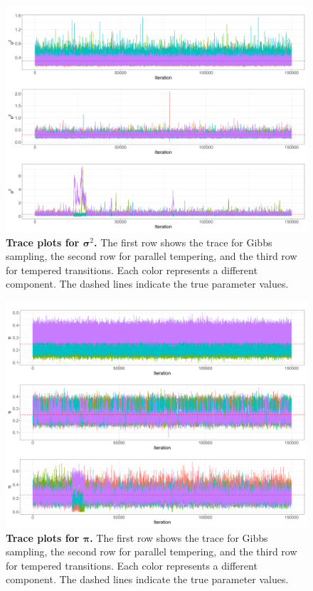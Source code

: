 \documentclass[11pt]{article}
\newcommand{\bpi}{\boldsymbol{\pi}}
\newcommand{\bsigma}{\boldsymbol{\sigma}}
\begin{document}
\begin{figure}[!ht]
    \centering
    \includegraphics[scale=0.4]{figures/trace_sigma2_random_beta.png}
    \caption{\textbf{Trace plots for $\bsigma^2$.} The first row shows the trace for Gibbs sampling, the second 
    row for parallel tempering, and the third row for tempered transitions. Each color represents a different 
    component. The dashed lines indicate the true parameter values.}
    \label{fig:trace_plots_sigma}
\end{figure}

\begin{figure}[!ht]
    \centering
    \includegraphics[scale=0.4]{figures/trace_p_random_beta.png}
    \caption{\textbf{Trace plots for $\bpi$.} The first row shows the trace for Gibbs sampling, the second row for
    parallel tempering, and the third row for tempered transitions. Each color represents a different component. 
    The dashed lines indicate the true parameter values.}
    \label{fig:trace_plots_pi}
\end{figure}
\end{document}
